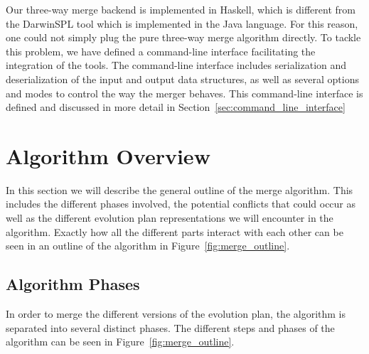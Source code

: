 \documentclass[a4paper,english]{ifimaster}
\begin{document}
Our three-way merge backend is implemented in Haskell, which is different from the DarwinSPL tool which is implemented in the Java language. For this reason, one could not simply plug the pure three-way merge algorithm directly. To tackle this problem, we have defined a command-line interface facilitating the integration of the tools. The command-line interface includes serialization and deserialization of the input and output data structures, as well as several options and modes to control the way the merger behaves. This command-line interface is defined and discussed in more detail in Section~\vref{sec:command_line_interface}

\section{Algorithm Overview}%
\label{sec:algorithm_overview}

In this section we will describe the general outline of the merge algorithm. This includes the different phases involved, the potential conflicts that could occur as well as the different evolution plan representations we will encounter in the algorithm. Exactly how all the different parts interact with each other can be seen in an outline of the algorithm in Figure~\vref{fig:merge_outline}.

\subsection{Algorithm Phases}%
\label{sub:algorithm_phases}

In order to merge the different versions of the evolution plan, the algorithm is separated into several distinct phases. The different steps and phases of the algorithm can be seen in Figure~\ref{fig:merge_outline}.
\end{document}
